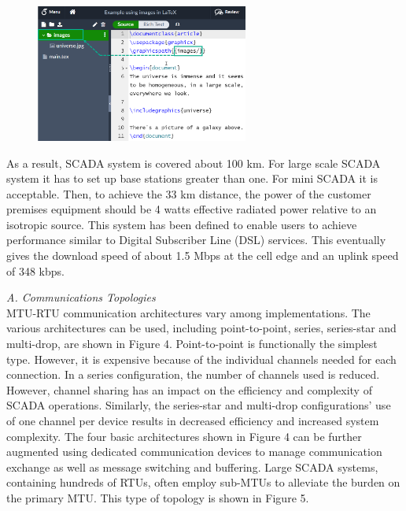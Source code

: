 \documentclass[conference]{IEEEtran}
\begin{document}
\begin{Summary - }
\vspace{1cm}


\begin{figure}[h!] %
  \centering
  \includegraphics[width=2.75in]{im2.png}\\
\end{figure}

\vspace{1cm}


As a result, SCADA system is covered about 100 km. For
large scale SCADA system it has to set up base stations greater
than one. For mini SCADA it is acceptable. Then, to achieve
the 33 km distance, the power of the customer premises
equipment should be 4 watts effective radiated power relative
to an isotropic source. This system has been defined to enable
users to achieve performance similar to Digital Subscriber Line
(DSL) services. This eventually gives the download speed of
about 1.5 Mbps at the cell edge and an uplink speed of 348
kbps.

\vspace{1cm}\emph{A. \hspace{0.3cm}Communications Topologies}\\
MTU-RTU communication architectures vary among
implementations. The various architectures can be used,
including point-to-point, series, series-star and multi-drop, are
shown in Figure 4. Point-to-point is functionally the simplest
type. However, it is expensive because of the individual
channels needed for each connection. In a series configuration,
the number of channels used is reduced. However, channel
sharing has an impact on the efficiency and complexity of
SCADA operations. Similarly, the series-star and multi-drop
configurations’ use of one channel per device results in
decreased efficiency and increased system complexity. The
four basic architectures shown in Figure 4 can be further
augmented using dedicated communication devices to manage
communication exchange as well as message switching and
buffering. Large SCADA systems, containing hundreds of
RTUs, often employ sub-MTUs to alleviate the burden on the
primary MTU. This type of topology is shown in Figure 5.


\end{Summary - }
\end{document}
